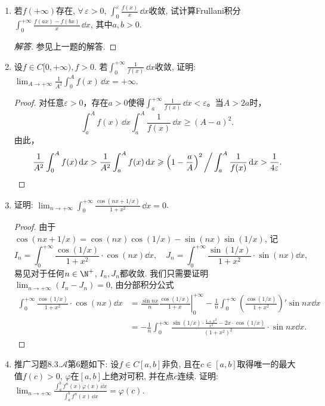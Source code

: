 \begin{a}
\begin{enumerate}
\begin{proof}[解答]
同理若\(f(+\infty)\)存在, \(\forall\,\varepsilon>0,\int_{0}^{\varepsilon}\frac{f(x)}{x}\,\dd x\)收敛, 则
\[J_1=\int_{a\delta}^{b\delta}\frac{f(t)}{t}\,\mathrm{d}t
=\int_{a\delta}^{\varepsilon}\frac{f(t)}{t}\,\mathrm{d}t
-\int_{b\delta}^{\varepsilon}\frac{f(t)}{t}\,\mathrm{d}t\rightarrow0,\quad\delta\rightarrow 0^+.\]
从而\(\int_0^{+\infty}\frac{f(ax)-f(bx)}{x}\,\mathrm{d}x=f(+\infty)\ln\frac{a}{b}.\)
\end{proof}
\item 若\(f(+\infty)\)存在, \(\forall\,\varepsilon>0\), 
\(\int_{0}^{\varepsilon}\frac{f(x)}{x}\,\dd x\)收敛, 
试计算Frullani积分\(\int_{0}^{+\infty}\frac{f(ax)-f(bx)}{x}\,\dd x\), 其中\(a,b>0\).
\begin{proof}[解答]
参见上一题的解答.
\end{proof}
\item 设\(f\in C[0,+\infty),f>0\). 若\(\int_{0}^{+\infty}\frac{1}{f(x)}\,\dd x\)收敛, 
证明: \(\lim_{A\rightarrow+\infty}\frac{1}{A^2}\int_{0}^{A}f(x)\,\dd x=+\infty\).
\begin{proof}
对任意$\varepsilon>0$，存在$a>0$使得\(\int_a^{+\infty}\frac{1}{f(x)}\,\dd x<\varepsilon\)。当$A>2a$时，
\[\int_a^Af(x)\,\dd x\int_a^A\frac{1}{f(x)}\,\dd x\geqslant(A-a)^2.\]
由此，
\[\frac{1}{A^2}\int_0^A f(x)\,{\rm d} x>\frac{1}{A^2}\int_a^A f(x)\,{\rm d} x
\geqslant\left(1-\frac{a}{A}\right)^2\bigg/\int_a^A\frac{1}{f(x)}\,{\rm d} x
>\frac{1}{4\varepsilon}.\qedhere\]
\end{proof}
\item 证明: \(\lim_{n\rightarrow+\infty}\int_{0}^{+\infty}\frac{\cos\left(nx+1/x\right)}{1+x^2}\,\dd x=0\).
\begin{proof}
由于\(\cos\left(nx+1/x\right)=\cos(nx)\cos\left(1/x\right)-\sin(nx)\sin(1/x)\), 记
\[I_n=\int_{0}^{+\infty}\frac{\cos(1/x)}{1+x^2}\cdot\cos(nx)\dd x,\quad J_n=\int_{0}^{+\infty}\frac{\sin(1/x)}{1+x^2}\cdot\sin(nx)\dd x,\]
易见对于任何\(n\in\N^+\), \(I_n,J_n\)都收敛. 我们只需要证明\(\lim_{n\rightarrow+\infty}\left(I_n-J_n\right)=0\), 由分部积分公式
\[\begin{split}
\int_{0}^{+\infty}\frac{\cos(1/x)}{1+x^2}\cdot\cos(nx)\dd x
&=\left.\frac{\sin nx}{n}\frac{\cos(1/x)}{1+x}\right|_0^{+\infty}-\frac{1}{n}\int_{0}^{+\infty}\left(\frac{\cos(1/x)}{1+x^2}\right)'\sin nx\dd x\\
&=-\frac{1}{n}\int_{0}^{+\infty}\frac{\sin(1/x)\cdot\frac{1+x^2}{x^2}-2x\cdot\cos(1/x)}{(1+x^2)^2}\cdot\sin nx\dd x.
\end{split}\]
\end{proof}
\item 推广习题8.3.\(\boldsymbol{\mathcal{A}}\)第6题如下: 
设\(f\in C[a,b]\)非负, 且在\(c\in[a,b]\)取得唯一的最大值\(f(c)>0\), 
\(\varphi\)在\([a,b]\)上绝对可积, 并在点\(c\)连续. 
证明: \(\lim_{n\rightarrow+\infty}\frac{\displaystyle\int_{a}^{b}f^n(x)\varphi(x)\,\dd x}{\displaystyle\int_{a}^{b}f^n(x)\,\dd x}=\varphi(c)\).
\end{enumerate}
\end{a}

